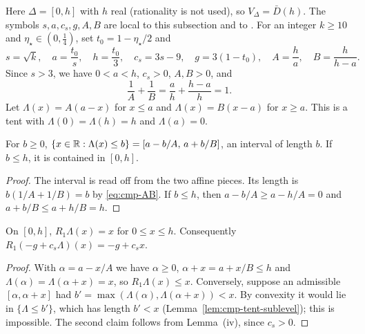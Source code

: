 Here $\Delta=[0,h]$ with $h$ real (rationality is not used), so $V_\Delta=\bar D(h)$. The symbols $s,a,c_s,g,A,B$ are local to this subsection and to . For an integer $k\ge10$ and $\eta_\star\in(0,\frac14)$, set $t_0=1-\eta_\star/2$ and
\[
s=\sqrt k,\quad a=\frac{t_0}s,\quad h=\frac{t_0}3,\quad c_s=3s-9,\quad g=3(1-t_0),\quad A=\frac ha,\quad B=\frac h{h-a}.
\]
Since $s>3$, we have $0<a<h$, $c_s>0$, $A,B>0$, and
\begin{equation}\label{eq:cmp-AB}
\frac1A+\frac1B=\frac ah+\frac{h-a}h=1 .
\end{equation}
Let $\Lambda(x)=A(a-x)$ for $x\le a$ and $\Lambda(x)=B(x-a)$ for $x\ge a$. This is a tent with $\Lambda(0)=\Lambda(h)=h$ and $\Lambda(a)=0$.

\begin{lemma}\label{lem:cmp-tent-sublevel}
For $b\ge0$, $\{x\in\mathbb{R}:\Lambda(x)\le b\}=[a-b/A,\,a+b/B]$, an interval of length $b$. If $b\le h$, it is
contained in $[0,h]$.
\end{lemma}

\begin{proof}
The interval is read off from the two affine pieces. Its length is $b(1/A+1/B)=b$ by \eqref{eq:cmp-AB}. If $b\le h$, then $a-b/A\ge a-h/A=0$ and $a+b/B\le a+h/B=h$.
\end{proof}

\begin{corollary}\label{thm:cmp-tent-rearrangement}
On $[0,h]$, $R_1\Lambda(x)=x$ for $0\le x\le h$. Consequently
$R_1(-g+c_s\Lambda)(x)=-g+c_sx$.
\end{corollary}

\begin{proof}
With $\alpha=a-x/A$ we have $\alpha\ge0$, $\alpha+x=a+x/B\le h$ and $\Lambda(\alpha)=\Lambda(\alpha+x)=x$, so $R_1\Lambda(x)\le x$. Conversely, suppose an admissible $[\alpha,\alpha+x]$ had $b'=\max(\Lambda(\alpha),\Lambda(\alpha+x))<x$. By convexity it would lie in $\{\Lambda\le b'\}$, which has length $b'<x$ (Lemma~\ref{lem:cmp-tent-sublevel}); this is impossible. The second claim follows from Lemma~(iv), since $c_s>0$.
\end{proof}

